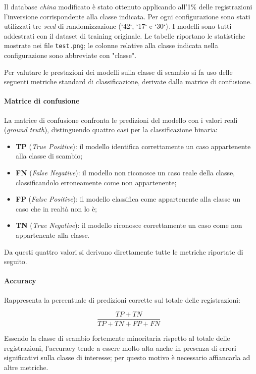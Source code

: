 Il database \emph{china} modificato è stato ottenuto applicando all'1\% delle registrazioni l'inversione corrispondente alla classe indicata. Per ogni configurazione sono stati utilizzati tre \emph{seed} di randomizzazione (`42`, `17` e `30`). I modelli sono tutti addestrati con il dataset di training originale. Le tabelle riportano le statistiche mostrate nei file \texttt{test.png}; le colonne relative alla classe indicata nella configurazione sono abbreviate con "classe".

Per valutare le prestazioni dei modelli sulla classe di scambio si fa uso delle seguenti metriche standard di classificazione, derivate dalla matrice di confusione.

\paragraph{Matrice di confusione}
La matrice di confusione confronta le predizioni del modello con i valori reali (\emph{ground truth}), distinguendo quattro casi per la classificazione binaria:

\begin{itemize}
	\item \textbf{TP} (\emph{True Positive}): il modello identifica correttamente un caso appartenente alla classe di scambio;
	\item \textbf{FN} (\emph{False Negative}): il modello non riconosce un caso reale della classe, classificandolo erroneamente come non appartenente;
	\item \textbf{FP} (\emph{False Positive}): il modello classifica come appartenente alla classe un caso che in realtà non lo è;
	\item \textbf{TN} (\emph{True Negative}): il modello riconosce correttamente un caso come non appartenente alla classe.
\end{itemize}

Da questi quattro valori si derivano direttamente tutte le metriche riportate di seguito.

\paragraph{Accuracy}
Rappresenta la percentuale di predizioni corrette sul totale delle registrazioni:

\begin{equation}
	\frac{TP + TN}{TP + TN + FP + FN}
\end{equation}

Essendo la classe di scambio fortemente minoritaria rispetto al totale delle registrazioni, l'accuracy tende a essere molto alta anche in presenza di errori significativi sulla classe di interesse; per questo motivo è necessario affiancarla ad altre metriche.

